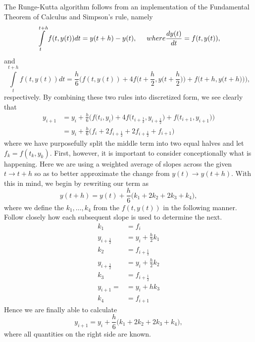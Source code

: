 \documentclass[11pt,a4paper]{article}
\begin{document}
The Runge-Kutta algorithm follows from an implementation of the Fundamental Theorem of Calculus and Simpson's rule, namely
\begin{equation}
\int\limits_t^{t+h} f(t,y(t))dt = y(t+h) - y(t), \hspace{0.5 cm} where \frac{dy(t)}{dt} = f(t,y(t)),
\end{equation}
and
\begin{equation}
\int\limits_t^{t+h} f(t,y(t))dt = \frac{h}{6}\bigg(f(t,y(t)) + 4f\Big(t+\frac{h}{2},y\big(t+\frac{h}{2}\big)\Big)+f\Big(t+h,y\big(t+h\big)\Big)\bigg),
\end{equation}
respectively. By combining these two rules into discretized form, we see clearly that
\begin{align}
y_{i+1} &= y_i + \frac{h}{6}\Big(f\big(t_i,y_i\big) + 4f\big(t_{i+\frac{1}{2}},y_{i+\frac{1}{2}}\big)+f\big(t_{i+1},y_{i+1}\big)\Big) \\
		&= y_i + \frac{h}{6}\Big(f_i + 2f_{i+\frac{1}{2}} + 2f_{i+\frac{1}{2}} + f_{i+1}\Big)
\end{align}
where we have purposefully split the middle term into two equal halves and let $f_k = f(t_k,y_k)$. First, however, it is important to consider conceptionally what is happening. Here we are using a weighted average of slopes across the given $t \rightarrow t+h$ so as to better approximate the change from $y(t) \rightarrow y(t+h)$. With this in mind, we begin by rewriting our term as
\begin{equation}
y(t+h) = y(t) + \frac{h}{6}\big(k_1 + 2k_2 + 2k_3 + k_4\big),
\end{equation}
where we define the $k_1, \dots, k_4$ from the $f(t,y(t))$ in the following manner. Follow closely how each subsequent slope is used to determine the next.
\begin{align}
k_1 &= f_i \\
y_{i+\frac{1}{2}} &= y_i + \frac{h}{2}k_1 \\
k_2 &= f_{i+\frac{1}{2}} \\
y_{i+\frac{1}{2}} &= y_i + \frac{h}{2}k_2 \\
k_3 &= f_{i+\frac{1}{2}} \\
y_{i+1} = &= y_i + hk_3 \\
k_4 &= f_{i+1}
\end{align}
Hence we are finally able to calculate
\begin{equation}
y_{i+1} = y_i + \frac{h}{6}\big(k_1 + 2k_2 + 2k_3 + k_4\big),
\end{equation}
where all quantities on the right side are known. 
\end{document}
